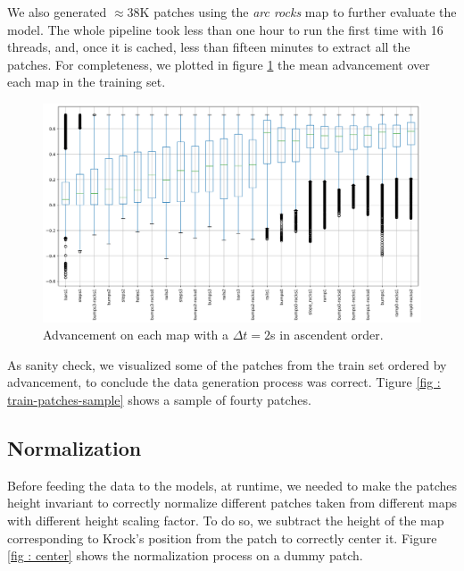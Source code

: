 \documentclass[../document.tex]{subfiles}
\begin{document}
We also generated $\approx 38$K patches using the \emph{arc rocks} map to further evaluate the model. The whole pipeline took less than one hour to run the first time with 16 threads, and, once it is cached, less than fifteen minutes to extract all the patches. For completeness, we plotted in figure \ref{fig : mean-advs-train} the mean advancement over each map in the training set. 
\begin{figure}[htbp]
    \centering
    \includegraphics[width=\linewidth]{../img/datasets/box_for_each_map.png}
    \caption{Advancement on each map with a $\Delta t = 2$s in ascendent order.}
    \label{fig : mean-advs-train}
\end{figure}
As sanity check, we visualized some of the patches from the train set ordered by advancement, to conclude the data generation process was correct. Tigure \ref{fig : train-patches-sample} shows a sample of fourty patches.


\subsection{Normalization}
Before feeding the data to the models, at runtime, we needed to make the patches height invariant to correctly normalize different patches taken from different maps with different height scaling factor. To do so, we subtract the height of the map corresponding to Krock's position from the patch to correctly center it. Figure \ref{fig : center} shows the normalization process on a dummy patch.
\end{document}
